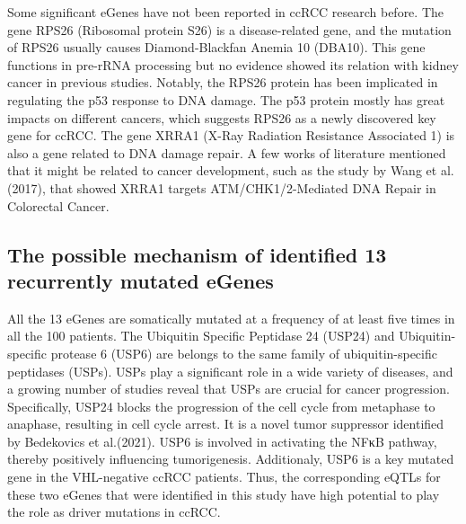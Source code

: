 Some significant eGenes have not been reported in ccRCC research before. The gene RPS26 (Ribosomal protein S26) is a disease-related gene, and the mutation of RPS26 usually causes Diamond-Blackfan Anemia 10 (DBA10)\cite{doherty_ribosomal_2010}. This gene functions in pre-rRNA processing but no evidence showed its relation with kidney cancer in previous studies. Notably, the RPS26 protein has been implicated in regulating the p53 response to DNA damage\cite{cui_ribosomal_2014}. The p53 protein mostly has great impacts on different cancers, which suggests RPS26 as a newly discovered key gene for ccRCC. The gene XRRA1 (X-Ray Radiation Resistance Associated 1) is also a gene related to DNA damage repair. A few works of literature mentioned that it might be related to cancer development, such as the study by Wang et al.(2017)\cite{wang_xrra1_2017}, that showed XRRA1 targets ATM/CHK1/2-Mediated DNA Repair in Colorectal Cancer.

\subsection{The possible mechanism of identified 13 recurrently mutated eGenes}

All the 13 eGenes are somatically mutated at a frequency of at least five times in all the 100 patients. The Ubiquitin Specific Peptidase 24 (USP24) and Ubiquitin-specific protease 6 (USP6) are belongs to the same family of ubiquitin-specific peptidases (USPs). USPs play a significant role in a wide variety of diseases, and a growing number of studies reveal that USPs are crucial for cancer progression. Specifically, USP24 blocks the progression of the cell cycle from metaphase to anaphase, resulting in cell cycle arrest. It is a novel tumor suppressor identified by Bedekovics et al.(2021)\cite{bedekovics_usp24_2021}. USP6 is involved in activating the NFκB pathway, thereby positively influencing tumorigenesis\cite{young_role_2019}. Additionaly, USP6 is a key mutated gene in the VHL-negative ccRCC patients\cite{tan_establishment_2013}. Thus, the corresponding eQTLs for these two eGenes that were identified in this study have high potential to play the role as driver mutations in ccRCC.

